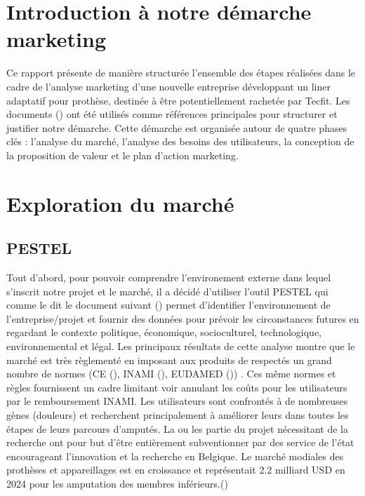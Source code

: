 \section{Introduction à notre démarche marketing}

Ce rapport présente de manière structurée l'ensemble des étapes réalisées dans le cadre de l'analyse marketing d'une nouvelle entreprise développant un liner adaptatif pour prothèse, destinée à être potentiellement rachetée par Tecfit.
Les documents (\cite{ref:ibe-mkt,ref:lambin}) ont été utilisés comme références principales pour structurer et justifier notre démarche. Cette démarche est organisée autour de quatre phases clés : l'analyse du marché, l'analyse des besoins des utilisateurs, la conception de la proposition de valeur et le plan d'action marketing.

\section{Exploration du marché}

\subsection{PESTEL}

Tout d'abord, pour pouvoir comprendre l'environement externe dans lequel s'inscrit notre projet et le marché, il a décidé d'utiliser l'outil PESTEL qui comme le dit le document suivant (\cite{ref:pestel}) permet d'identifier l'environnement de l'entreprise/projet et fournir des données pour prévoir les circonstances futures en regardant le contexte politique, économique, socioculturel, technologique, environnemental et légal.
Les principaux résultats de cette analyse montre que le marché est très règlementé en imposant aux produits de respectés un grand nombre de normes (CE (\cite{ref:ce}), INAMI (\cite{ref:inami}), EUDAMED (\cite{ref:eudamed})) . Ces même normes et règles fournissent un cadre limitant voir annulant les coûts pour les utilisateurs par le remboursement INAMI. Les utilisateurs sont confrontés à de nombreuses gènes (douleurs) et recherchent principalement à améliorer leurs dans toutes les étapes de leurs parcours d'amputés. 
La ou les partie du projet nécessitant de la recherche ont pour but d'être entièrement subventionner par des service de l'état encourageant l'innovation et la recherche en Belgique. Le marché modiales des prothèses et appareillages est en croissance et représentait 2.2 milliard USD en 2024 pour les amputation des membres inférieurs.(\cite{ref:lowerlimb})

